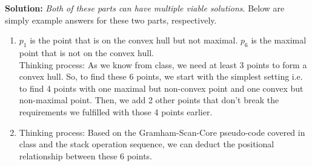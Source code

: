 \documentclass[11pt]{article}
\begin{document}
\begin{qunlist}
{\bf Solution:}
\emph{Both of these parts can have multiple viable solutions}. Below are simply example answers for these two parts, respectively.
\begin{enumerate}
    \item 

    $p_1$ is the point that is on the convex hull but not maximal. $p_6$ is the maximal point that is not on the convex hull.\\
    Thinking process: As we know from class, we need at least 3 points to form a convex hull. So, to find these 6 points, we start with the simplest setting i.e. to find 4 points with one maximal but non-convex point and one convex but non-maximal point. Then, we add 2 other points that don't break the requirements we fulfilled with those 4 points earlier.


    \item 

    Thinking process: Based on the Gramham-Scan-Core pseudo-code covered in class and the stack operation sequence, we can deduct the positional relationship between these 6 points.



\end{enumerate}
\end{qunlist}
\end{document}
